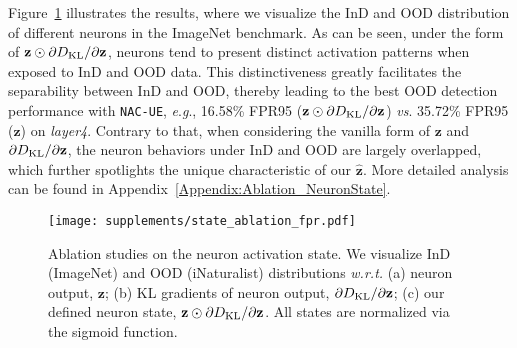 \documentclass{article} \usepackage{iclr2024_conference,times}
\newcommand{\eg}{\textit{e}.\textit{g}.}
\begin{document}
Figure~\ref{Fig:Detection_Distr} illustrates the results, where we visualize the InD and OOD distribution of different neurons in the ImageNet benchmark. 
As can be seen, under the form of $\mathbf{z} \odot \partial D_{\rm KL}/\partial \mathbf{z}$, neurons tend to present distinct activation patterns when exposed to InD and OOD data. 
This distinctiveness greatly facilitates the separability between InD and OOD, thereby leading to the best OOD detection performance with \texttt{NAC-UE}, \eg, 16.58\% FPR95 ($\mathbf{z} \odot \partial D_{\rm KL}/\partial \mathbf{z}$) \textit{vs}. 35.72\% FPR95 ($\mathbf{z}$) on \textit{layer4}.
Contrary to that, when considering the vanilla form of ${\mathbf{z}}$ and $\partial D_{\rm KL}/\partial \mathbf{z}$, the neuron behaviors under InD and OOD are largely overlapped, which further spotlights the unique characteristic of our $\hat{\mathbf{z}}$.  More detailed analysis can be found in Appendix~\ref{Appendix:Ablation_NeuronState}.



























\begin{figure*}
	[t]
	\centering \texttt{[image: supplements/state\_ablation\_fpr.pdf]} \vspace{-2mm}
	\caption{Ablation studies on the neuron activation state. We visualize InD (ImageNet) and OOD (iNaturalist) distributions \textit{w.r.t.} (a) neuron output, $\mathbf{z}$; (b) KL gradients of neuron output, $\partial D_{\rm KL}/\partial \mathbf{z}$; (c) our defined neuron state, $\mathbf{z} \odot \partial D_{\rm KL}/\partial \mathbf{z}$. All states are normalized via the sigmoid function.}
	\label{Fig:Detection_Distr}
	\vspace{-2mm}
\end{figure*}
\end{document}
